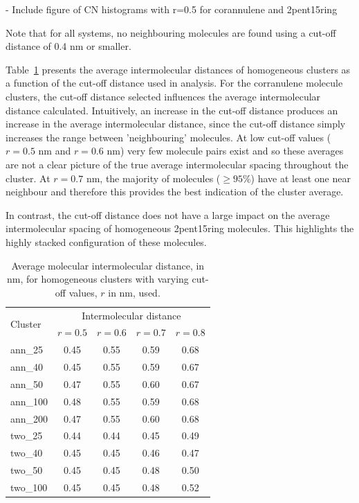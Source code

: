 - Include figure of CN histograms with r=0.5 for corannulene and 2pent15ring

Note that for all systems, no neighbouring molecules are found using a cut-off distance of 0.4 nm or smaller.


Table~\ref{tableSI:intermolecdistscutoff} presents the average intermolecular distances of homogeneous clusters as a function of the cut-off distance used in analysis. For the corranulene molecule clusters, the cut-off distance selected influences the average intermolecular distance calculated.  Intuitively, an increase in the cut-off distance produces an increase in the average intermolecular distance, since the cut-off distance simply increases the range between 'neighbouring' molecules. At low cut-off values ($r = 0.5$ nm and $r = 0.6$ nm) very few molecule pairs exist and so these averages are not a clear picture of the true average intermolecular spacing throughout the cluster.  At $r = 0.7$ nm, the majority of molecules ($\ge 95$\%) have at least one near neighbour and therefore this provides the best indication of the cluster average.

In contrast, the cut-off distance does not have a large impact on the average intermolecular spacing of homogeneous 2pent15ring molecules.  This highlights the highly stacked configuration of these molecules.




% 
\begin{table}[]
\centering
\caption{Average molecular intermolecular distance, in nm, for homogeneous clusters with varying cut-off values, $r$ in nm, used.}
\label{tableSI:intermolecdistscutoff}
\begin{tabular}{lcccc}
\hline
\multicolumn{1}{l}{\multirow{2}{*}{Cluster}} & \multicolumn{4}{c}{\multirow{1}{*}{Intermolecular distance}} \\
 & $r = 0.5$ & $r = 0.6$ & $r = 0.7$ & $r = 0.8$ \\ \hline
ann\_25 & 0.45 & 0.55 & 0.59 & 0.68 \\
ann\_40 & 0.45 & 0.55 & 0.59 & 0.67 \\
ann\_50 & 0.47 & 0.55 & 0.60 & 0.67 \\
ann\_100 & 0.48 & 0.55 & 0.59 & 0.68 \\
ann\_200 & 0.47 & 0.55 & 0.60 & 0.68 \\ \hline
two\_25 & 0.44 & 0.44 & 0.45 & 0.49 \\
two\_40 & 0.45 & 0.45 & 0.46 & 0.47 \\
two\_50 & 0.45 & 0.45 & 0.48 & 0.50 \\ 
two\_100 & 0.45 & 0.45 & 0.48 & 0.52 \\ \hline
\end{tabular}
\end{table}
%





